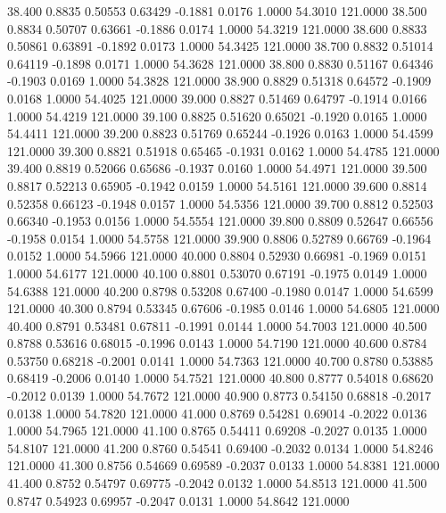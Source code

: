   38.400   0.8835   0.50553   0.63429  -0.1881   0.0176   1.0000  54.3010 121.0000
  38.500   0.8834   0.50707   0.63661  -0.1886   0.0174   1.0000  54.3219 121.0000
  38.600   0.8833   0.50861   0.63891  -0.1892   0.0173   1.0000  54.3425 121.0000
  38.700   0.8832   0.51014   0.64119  -0.1898   0.0171   1.0000  54.3628 121.0000
  38.800   0.8830   0.51167   0.64346  -0.1903   0.0169   1.0000  54.3828 121.0000
  38.900   0.8829   0.51318   0.64572  -0.1909   0.0168   1.0000  54.4025 121.0000
  39.000   0.8827   0.51469   0.64797  -0.1914   0.0166   1.0000  54.4219 121.0000
  39.100   0.8825   0.51620   0.65021  -0.1920   0.0165   1.0000  54.4411 121.0000
  39.200   0.8823   0.51769   0.65244  -0.1926   0.0163   1.0000  54.4599 121.0000
  39.300   0.8821   0.51918   0.65465  -0.1931   0.0162   1.0000  54.4785 121.0000
  39.400   0.8819   0.52066   0.65686  -0.1937   0.0160   1.0000  54.4971 121.0000
  39.500   0.8817   0.52213   0.65905  -0.1942   0.0159   1.0000  54.5161 121.0000
  39.600   0.8814   0.52358   0.66123  -0.1948   0.0157   1.0000  54.5356 121.0000
  39.700   0.8812   0.52503   0.66340  -0.1953   0.0156   1.0000  54.5554 121.0000
  39.800   0.8809   0.52647   0.66556  -0.1958   0.0154   1.0000  54.5758 121.0000
  39.900   0.8806   0.52789   0.66769  -0.1964   0.0152   1.0000  54.5966 121.0000
  40.000   0.8804   0.52930   0.66981  -0.1969   0.0151   1.0000  54.6177 121.0000
  40.100   0.8801   0.53070   0.67191  -0.1975   0.0149   1.0000  54.6388 121.0000
  40.200   0.8798   0.53208   0.67400  -0.1980   0.0147   1.0000  54.6599 121.0000
  40.300   0.8794   0.53345   0.67606  -0.1985   0.0146   1.0000  54.6805 121.0000
  40.400   0.8791   0.53481   0.67811  -0.1991   0.0144   1.0000  54.7003 121.0000
  40.500   0.8788   0.53616   0.68015  -0.1996   0.0143   1.0000  54.7190 121.0000
  40.600   0.8784   0.53750   0.68218  -0.2001   0.0141   1.0000  54.7363 121.0000
  40.700   0.8780   0.53885   0.68419  -0.2006   0.0140   1.0000  54.7521 121.0000
  40.800   0.8777   0.54018   0.68620  -0.2012   0.0139   1.0000  54.7672 121.0000
  40.900   0.8773   0.54150   0.68818  -0.2017   0.0138   1.0000  54.7820 121.0000
  41.000   0.8769   0.54281   0.69014  -0.2022   0.0136   1.0000  54.7965 121.0000
  41.100   0.8765   0.54411   0.69208  -0.2027   0.0135   1.0000  54.8107 121.0000
  41.200   0.8760   0.54541   0.69400  -0.2032   0.0134   1.0000  54.8246 121.0000
  41.300   0.8756   0.54669   0.69589  -0.2037   0.0133   1.0000  54.8381 121.0000
  41.400   0.8752   0.54797   0.69775  -0.2042   0.0132   1.0000  54.8513 121.0000
  41.500   0.8747   0.54923   0.69957  -0.2047   0.0131   1.0000  54.8642 121.0000

